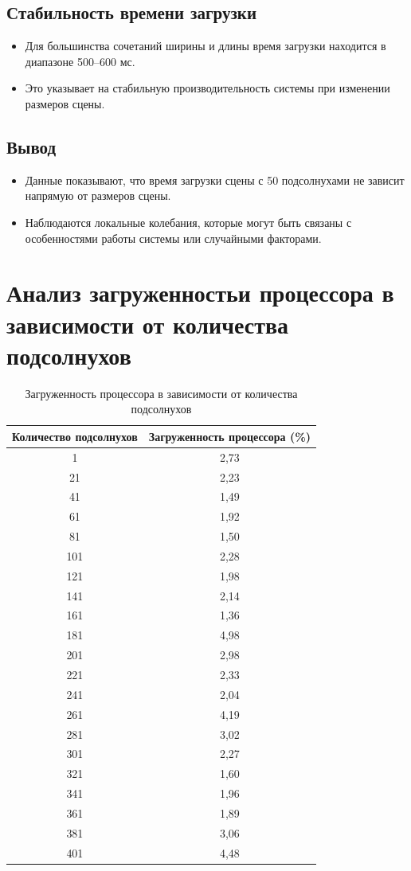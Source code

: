 \subsection{Стабильность времени загрузки}
\begin{itemize}
    \item Для большинства сочетаний ширины и длины время загрузки находится в диапазоне 500–600 мс.
    \item Это указывает на стабильную производительность системы при изменении размеров сцены.
\end{itemize}

\subsection{Вывод}
\begin{itemize}
    \item Данные показывают, что время загрузки сцены с 50 подсолнухами не зависит напрямую от размеров сцены.
    \item Наблюдаются локальные колебания, которые могут быть связаны с особенностями работы системы или случайными факторами.
\end{itemize}


\section{Анализ загруженностьи процессора в зависимости от количества подсолнухов}

\begin{table}[h!]
\centering
\caption{Загруженность процессора в зависимости от количества подсолнухов}
\label{tab:cpu_usage}
\begin{tabular}{|c|c|}
\hline
\textbf{Количество подсолнухов} & \textbf{Загруженность процессора (\%)} \\ \hline
1 & 2,73 \\ \hline
21 & 2,23 \\ \hline
41 & 1,49 \\ \hline
61 & 1,92 \\ \hline
81 & 1,50 \\ \hline
101 & 2,28 \\ \hline
121 & 1,98 \\ \hline
141 & 2,14 \\ \hline
161 & 1,36 \\ \hline
181 & 4,98 \\ \hline
201 & 2,98 \\ \hline
221 & 2,33 \\ \hline
241 & 2,04 \\ \hline
261 & 4,19 \\ \hline
281 & 3,02 \\ \hline
301 & 2,27 \\ \hline
321 & 1,60 \\ \hline
341 & 1,96 \\ \hline
361 & 1,89 \\ \hline
381 & 3,06 \\ \hline
401 & 4,48 \\ \hline
\end{tabular}
\end{table}

